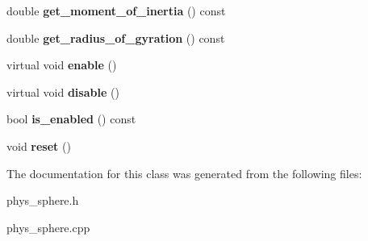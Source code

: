 \begin{DoxyCompactItemize}
\item 
\hypertarget{class_phys__sphere_ae95cd26515180dfe0e3e1b8e57c8919e}{
double {\bfseries get\_\-moment\_\-of\_\-inertia} () const }
\label{class_phys__sphere_ae95cd26515180dfe0e3e1b8e57c8919e}

\item 
\hypertarget{class_phys__sphere_a2313ef5c25ad89f4bd1b7d3b73cb3861}{
double {\bfseries get\_\-radius\_\-of\_\-gyration} () const }
\label{class_phys__sphere_a2313ef5c25ad89f4bd1b7d3b73cb3861}

\item 
\hypertarget{class_phys__sphere_aa7c89a905f45684f2fed448fb539dfaa}{
virtual void {\bfseries enable} ()}
\label{class_phys__sphere_aa7c89a905f45684f2fed448fb539dfaa}

\item 
\hypertarget{class_phys__sphere_adcefc9c35260033a9baeb05c88bb1b35}{
virtual void {\bfseries disable} ()}
\label{class_phys__sphere_adcefc9c35260033a9baeb05c88bb1b35}

\item 
\hypertarget{class_phys__sphere_a547b4e106ff090f4ac129d2ed2ae0095}{
bool {\bfseries is\_\-enabled} () const }
\label{class_phys__sphere_a547b4e106ff090f4ac129d2ed2ae0095}

\item 
\hypertarget{class_phys__sphere_a844c2ec14aed58bcfcdf9136ec82068d}{
void {\bfseries reset} ()}
\label{class_phys__sphere_a844c2ec14aed58bcfcdf9136ec82068d}

\end{DoxyCompactItemize}


The documentation for this class was generated from the following files:\begin{DoxyCompactItemize}
\item 
phys\_\-sphere.h\item 
phys\_\-sphere.cpp\end{DoxyCompactItemize}
